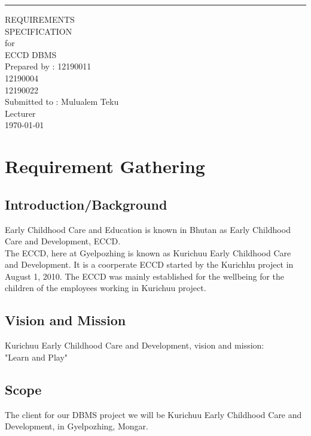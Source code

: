 \documentclass{scrreprt}
\date{}
\begin{document}
\begin{flushright}
    \rule{16cm}{5pt}\vskip1cm
    \begin{bfseries}
        \LARGE{REQUIREMENTS\\ SPECIFICATION}\\
        \vspace{1.5cm}
        for\\
        \vspace{1.5cm}
        ECCD DBMS\\
        \vspace{1.5cm}
        Prepared by : 12190011\\12190004\\12190022\\
        \vspace{1.5cm}
        Submitted to :  Mulualem Teku\\Lecturer\\
        \vspace{1.5cm}
        \today\\
    \end{bfseries}
\end{flushright}


\newpage
\chapter{Requirement Gathering}

	\section{Introduction/Background}
Early Childhood Care and Education is known in Bhutan as Early Childhood Care and Development, ECCD.\\The ECCD, here at Gyelpozhing is known as Kurichuu Early Childhood Care and Development. It is a coorperate ECCD started by the Kurichhu project in August 1, 2010. The ECCD was mainly established for the wellbeing for the children of the employees working in Kurichuu project. 
 

	\section{Vision and Mission}
	Kurichuu Early Childhood Care and Development, vision and mission:\\
"Learn and Play"

	\section{Scope}
The client for our DBMS project we will be Kurichuu Early Childhood Care and Development, in Gyelpozhing, Mongar.  
\end{document}
